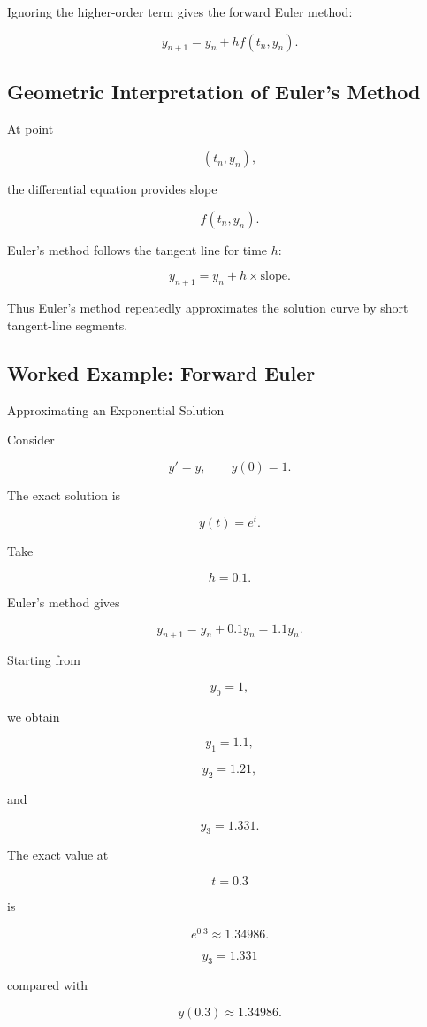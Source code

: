 Ignoring the higher-order term gives the forward Euler method:

\[
\boxed{
y_{n+1}
=
y_n
+
h
f(t_n,y_n).
}
\]

\subsection{Geometric Interpretation of Euler's Method}
\label{subsec:euler-geometric}

At point

\[
(t_n,y_n),
\]

the differential equation provides slope

\[
\boxed{
f(t_n,y_n).
}
\]

Euler's method follows the tangent line for time \(h\):

\[
\boxed{
y_{n+1}
=
y_n
+
h
\times
\text{slope}.
}
\]

Thus Euler's method repeatedly approximates the solution curve by short
tangent-line segments.

\subsection{Worked Example: Forward Euler}
\label{subsec:worked-forward-euler}

\begin{workedexamplebox}{Approximating an Exponential Solution}

Consider

\[
y'=y,
\qquad
y(0)=1.
\]

The exact solution is

\[
y(t)=e^t.
\]

Take

\[
h=0.1.
\]

Euler's method gives

\[
y_{n+1}
=
y_n+0.1y_n
=
1.1y_n.
\]

Starting from

\[
y_0=1,
\]

we obtain

\[
y_1=1.1,
\]

\[
y_2=1.21,
\]

and

\[
y_3=1.331.
\]

The exact value at

\[
t=0.3
\]

is

\[
e^{0.3}
\approx1.34986.
\]

\begin{answerbox}
\[
\boxed{
y_3=1.331
}
\]

compared with

\[
\boxed{
y(0.3)\approx1.34986.
}
\]
\end{answerbox}

\end{workedexamplebox}

